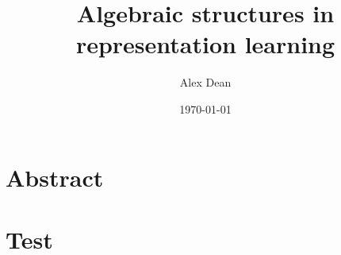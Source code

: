 \documentclass[justified]{LaTeX/tufte-book}
\title{Algebraic structures in representation learning}
\author{Alex Dean}
\date{\today}
\begin{document}
\doublespacing
\frontmatter

\begin{fullwidth}
    \singlespacing
    \tableofcontents
\end{fullwidth}

\begin{fullwidth}
    \listoffigures
    \listoftables
\end{fullwidth}

\chapter{Abstract}

\mainmatter


\chapter{Test}


\backmatter
\begin{fullwidth}
    \printbibliography
\end{fullwidth}
\end{document}
